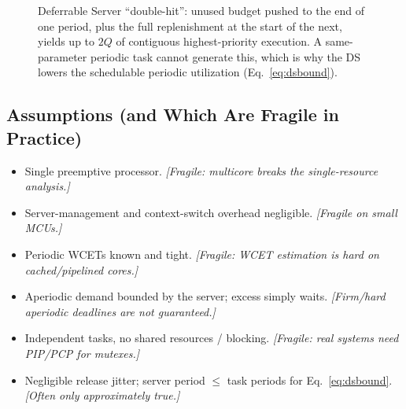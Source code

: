 \documentclass[conference]{IEEEtran}
\begin{document}
\begin{figure}[t]
\centering
{}
\caption{Deferrable Server ``double-hit'': unused budget pushed to the end of
one period, plus the full replenishment at the start of the next, yields up to
$2Q$ of contiguous highest-priority execution. A same-parameter periodic task
cannot generate this, which is why the DS lowers the schedulable periodic
utilization (Eq.~\eqref{eq:dsbound}).}
\label{fig:doublehit}
\end{figure}

\subsection{Assumptions (and Which Are Fragile in Practice)}

\begin{itemize}
  \item Single preemptive processor. \emph{[Fragile: multicore breaks the
        single-resource analysis.]}
  \item Server-management and context-switch overhead negligible.
        \emph{[Fragile on small MCUs.]}
  \item Periodic WCETs known and tight. \emph{[Fragile: WCET estimation is hard
        on cached/pipelined cores.]}
  \item Aperiodic demand bounded by the server; excess simply waits.
        \emph{[Firm/hard aperiodic deadlines are not guaranteed.]}
  \item Independent tasks, no shared resources / blocking.
        \emph{[Fragile: real systems need PIP/PCP for mutexes.]}
  \item Negligible release jitter; server period $\le$ task periods for
        Eq.~\eqref{eq:dsbound}. \emph{[Often only approximately true.]}
\end{itemize}
\end{document}
